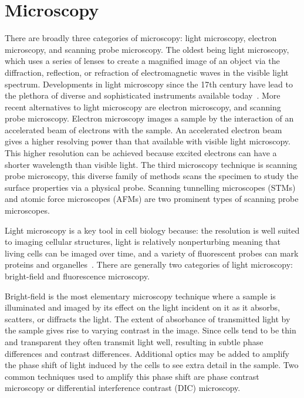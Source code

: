 \section{Microscopy}
\label{introduction:microscopy}
There are broadly three categories of microscopy: light microscopy, electron microscopy, and scanning probe microscopy. The oldest being light microscopy, which uses a series of lenses to create a magnified image of an object via the diffraction, reflection, or refraction of electromagnetic waves in the visible light spectrum. Developments in light microscopy since the 17th century have lead to the plethora of diverse and sophisticated instruments available today~\cite{Spector2006}. More recent alternatives to light microscopy are electron microscopy, and scanning probe microscopy. Electron microscopy images a sample by the interaction of an accelerated beam of electrons with the sample. An accelerated electron beam gives a higher resolving power than that available with visible light microscopy. This higher resolution can be achieved because excited electrons can have a shorter wavelength than visible light. The third microscopy technique is scanning probe microscopy, this diverse family of methods scans the specimen to study the surface properties via a physical probe. Scanning tunnelling microscopes (STMs) and atomic force microscopes (AFMs) are two prominent types of scanning probe microscopes.

Light microscopy is a key tool in cell biology because: the resolution is well suited to imaging cellular structures, light is relatively nonperturbing meaning that living cells can be imaged over time, and a variety of fluorescent probes can mark proteins and organelles~\cite{Thorn2016}. There are generally two categories of light microscopy: bright-field and fluorescence microscopy.

Bright-field is the most elementary microscopy technique where a sample is illuminated and imaged by its effect on the light incident on it as it absorbs, scatters, or diffracts the light. The extent of absorbance of transmitted light by the sample gives rise to varying contrast in the image. Since cells tend to be thin and transparent they often transmit light well, resulting in subtle phase differences and contrast differences. Additional optics may be added to amplify the phase shift of light induced by the cells to see extra detail in the sample. Two common techniques used to amplify this phase shift are phase contrast microscopy or differential interference contrast (DIC) microscopy.

